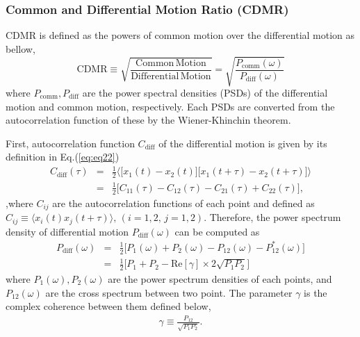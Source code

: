 \subsubsection{Common and Differential Motion Ratio (CDMR)}
CDMR is defined as the powers of common motion over the differential motion as bellow,
\begin{equation}
  \mathrm{CDMR} \equiv \sqrt{\frac{\mathrm{Common\,Motion}}{\mathrm{Differential\,Motion}}} = \sqrt{\frac{P_{\mathrm{comm}}(\omega)}{P_{\mathrm{diff}}(\omega)}} \label{eq:eq23}
\end{equation}
where $P_{\mathrm{comm}},P_{\mathrm{diff}}$ are the power spectral densities (PSDs) of the differential motion and common motion, respectively. Each PSDs are converted from the autocorrelation function of these by the Wiener-Khinchin theorem.

First, autocorrelation function $C_{\mathrm{diff}}$ of the differential motion is given by its definition in Eq.(\ref{eq:eq22})
\begin{eqnarray}
  C_{\mathrm{diff}}(\tau) &=& \frac{1}{2}
  \biggl\langle
  \biggl[ x_{1}(t)-x_{2}(t) \biggr] \biggl[ x_{1}(t+\tau)-x_{2}(t+\tau) \biggr]
  \biggr\rangle \\
  &=& \frac{1}{2}\biggl[ C_{11}(\tau) - C_{12}(\tau) - C_{21}(\tau) + C_{22}(\tau) \biggr], 
\end{eqnarray}
,where $C_{ij}$ are the autocorrelation functions of each point and defined as $ C_{ij} \equiv \langle x_{i}(t)x_{j}(t+\tau)\rangle,\, (i=1,2,\,j=1,2)$. Therefore, the power spectrum density of differential motion $P_{\mathrm{diff}}(\omega)$ can be computed as
\begin{eqnarray}
  P_{\mathrm{diff}}(\omega) &=& \frac{1}{2}\biggl[ P_{1}(\omega) + P_{2}(\omega) - P_{12}(\omega) - P_{12}^*(\omega) \biggr]\\
  &=& \frac{1}{2} \biggl[ P_{1}+P_{2} - \mathrm{Re}\left[\gamma \right]\times2\sqrt{P_{1}P_{2}} \biggr] \label{eq:eq31}
\end{eqnarray}
where $P_{1}(\omega),P_{2}(\omega)$ are the power spectrum densities of each points, and $P_{12}(\omega)$ are the cross spectrum between two point. The parameter $\gamma$ is the complex coherence between them defined below,
\begin{eqnarray}
  \gamma \equiv \frac{P_{12}}{\sqrt{P_{1}P_{2}}}.
\end{eqnarray}


